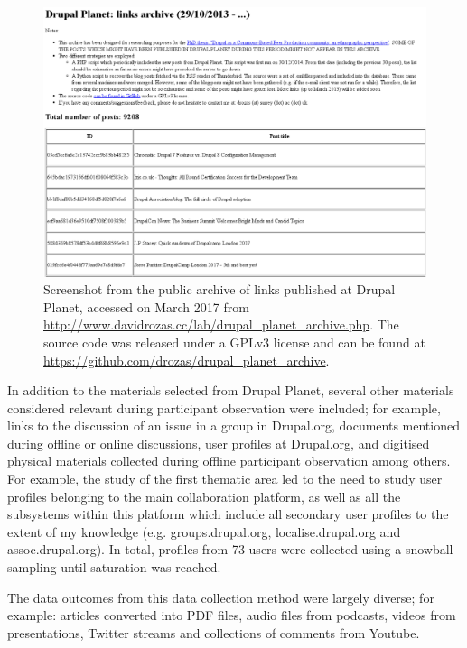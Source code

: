 \begin{figure}[H]
	\centering
	\includegraphics[scale=0.38]{img/methods/drupal_planet.png}
	\caption[Drupal Planet archive]%
    {Screenshot from the public archive of links published at Drupal Planet, accessed on  March 2017 from \url{http://www.davidrozas.cc/lab/drupal_planet_archive.php}. The source code was released under a GPLv3 license and can be found at \url{https://github.com/drozas/drupal_planet_archive}.}
	\label{drupal-planet-archive}
\end{figure}

In addition to the materials selected from Drupal Planet, several other materials considered relevant during participant observation were included; for example, links to the discussion of an issue in a group in Drupal.org, documents mentioned during offline or online discussions, user profiles at Drupal.org, and digitised physical materials collected during offline participant observation among others. For example, the study of the first thematic area led to the need to study user profiles belonging to the main collaboration platform, as well as all the subsystems within this platform which include all secondary user profiles to the extent of my knowledge (e.g. groups.drupal.org, localise.drupal.org and assoc.drupal.org). In total, profiles from 73 users were collected using a snowball sampling until saturation was reached.

The data outcomes from this data collection method were largely diverse; for example: articles converted into PDF files, audio files from podcasts, videos from presentations, Twitter streams and collections of comments from Youtube.

